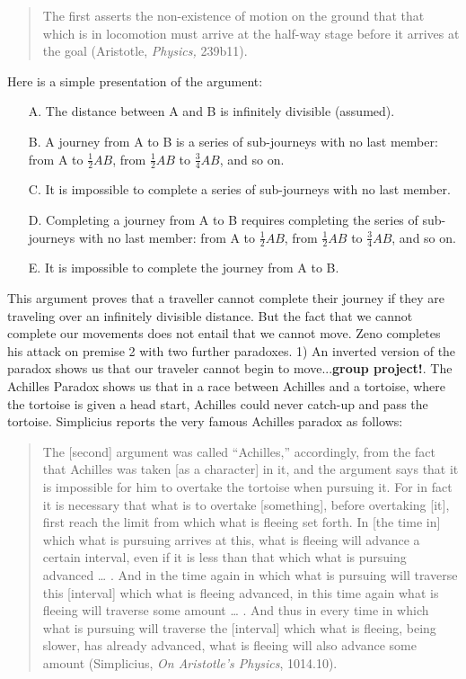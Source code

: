 \documentclass[oneside]{article}
\begin{document}
\begin{quote}
The first asserts the non-existence of motion on the ground that that
which is in locomotion must arrive at the half-way stage before it
arrives at the goal (Aristotle, \emph{Physics,} 239b11).
\end{quote}
Here is a simple presentation of the argument: 
\begin{enumerate}
\item[A.]  The distance between A and B is infinitely divisible (assumed).
\item[B.]  A journey from A to B is a series of sub-journeys with no last member:
  from A to \(\frac{1}{2}AB\), from \(\frac{1}{2}AB\) to
  \(\frac{3}{4}AB\), and so on.
\item[C.]  It is impossible to complete a series of sub-journeys with no last
  member.
\item[D.]  Completing a journey from A to B requires completing the series of
  sub-journeys with no last member: from A to \(\frac{1}{2}AB\), from
  \(\frac{1}{2}AB\) to \(\frac{3}{4}AB\), and so on.
\item[E.]  It is impossible to complete the journey from A to B.
\end{enumerate}
This argument proves that a traveller cannot complete their journey if they are traveling over an infinitely divisible distance. But the fact that we cannot complete our movements does not entail  that we cannot move. Zeno completes his attack on premise 2 with two further paradoxes. 1) An inverted version of the paradox shows us that our traveler cannot
  begin to move...\textbf{group project!}. The Achilles Paradox shows us that in a race
  between Achilles and a tortoise, where the tortoise is given a head
  start, Achilles could never catch-up and pass the tortoise. Simplicius reports the very famous Achilles paradox as follows: 
\begin{quote}
The {[}second{]} argument was called ``Achilles,'' accordingly, from the
fact that Achilles was taken {[}as a character{]} in it, and the
argument says that it is impossible for him to overtake the tortoise
when pursuing it. For in fact it is necessary that what is to overtake
{[}something{]}, before overtaking {[}it{]}, first reach the limit from
which what is fleeing set forth. In {[}the time in{]} which what is
pursuing arrives at this, what is fleeing will advance a certain
interval, even if it is less than that which what is pursuing advanced
\ldots{} . And in the time again in which what is pursuing will traverse
this {[}interval{]} which what is fleeing advanced, in this time again
what is fleeing will traverse some amount \ldots{} . And thus in every
time in which what is pursuing will traverse the {[}interval{]} which
what is fleeing, being slower, has already advanced, what is fleeing
will also advance some amount (Simplicius, \emph{On Aristotle's Physics},
1014.10).
\end{quote}
\end{document}
